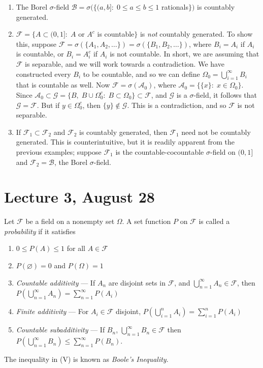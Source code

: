\documentclass[11pt,fleqn]{book} %
\begin{document}
\begin{enumerate}
	\item The Borel $\sigma$-field $\mathcal{B} = \sigma(\{(a,b]:\;0 \leq a \leq b \leq 1$ rationals$\})$ is countably generated.
	\item $\mathcal{F} = \{A \subset (0,1]:\;A$ or $A^c$ is countable$\}$ is \emph{not} countably generated. To show this, suppose $\mathcal{F} = \sigma(\{A_1,A_2,\dots\}) = \sigma(\{B_1,B_2,\dots\})$, where $B_i = A_i$ if $A_i$ is countable, or $B_i = A_i^c$ if $A_i$ is not countable. In short, we are assuming that $\mathcal{F}$ is separable, and we will work towards a contradiction. We have constructed every $B_i$ to be countable, and so we can define $\Omega_0 = \bigcup_{i=1}^\infty B_i$ that is countable as well. Now $\mathcal{F} = \sigma(\mathcal{A}_0)$, where $\mathcal{A}_0 = \{\{x\}:\;x \in \Omega_0\}$. Since $\mathcal{A}_0 \subset \mathcal{G} = \{B,\;B \cup \Omega_0^c:\;B \subset \Omega_0\} \subset \mathcal{F}$, and $\mathcal{G}$ is a $\sigma$-field, it follows that $\mathcal{G} = \mathcal{F}$. But if $y \in \Omega_0^c$, then $\{y\} \notin \mathcal{G}$. This is a contradiction, and so $\mathcal{F}$ is not separable.
	\item If $\mathcal{F}_1 \subset \mathcal{F}_2$ and $\mathcal{F}_2$ is countably generated, then $\mathcal{F}_1$ need not be countably generated. This is counterintuitive, but it is readily apparent from the previous examples; suppose $\mathcal{F}_1$ is the countable-cocountable $\sigma$-field on $(0,1]$ and $\mathcal{F}_2 = \mathcal{B}$, the Borel $\sigma$-field.
\end{enumerate}

\section{Lecture 3, August 28}

\begin{definition}[Probability]  \label{def:probability}
	Let $\mathcal{F}$ be a field on a nonempty set $\Omega$. A set function $P$ on $\mathcal{F}$ is called a \emph{probability} if it satisfies
	\begin{enumerate}[label=(\Roman*)]
		\item $0 \leq P(A) \leq 1$ for all $A \in \mathcal{F}$
		\item $P(\varnothing) = 0$ and $P(\Omega) = 1$
		\item \emph{Countable additivity} --- If $A_n$ are disjoint sets in $\mathcal{F}$, and $\bigcup_{n=1}^\infty A_n \in \mathcal{F}$, then $P \left( \bigcup_{n=1}^\infty A_n \right) = \sum_{n=1}^\infty P(A_i)$
		\item \emph{Finite additivity} --- For $A_i \in \mathcal{F}$ disjoint, $P \left( \bigcup_{i=1}^n A_i \right) = \sum_{i=1}^n P(A_i)$
		\item \emph{Countable subadditivity} --- If $B_n$, $\bigcup_{n=1}^\infty B_n \in \mathcal{F}$ then $P \left( \bigcup_{n=1}^\infty B_n \right) \leq \sum_{n=1}^\infty P(B_n)$.
	\end{enumerate}
	The inequality in (V) is known as \emph{Boole's Inequality}.
\end{definition}
\end{document}
